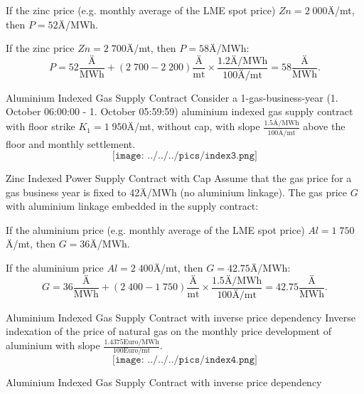 



	If the zinc price (e.g. monthly average of the LME spot price) $Zn=2\;000$Ä/mt, then \textcolor[rgb]{0.00,0.00,1.00}{$P=52$Ä/MWh}.


	If the zinc price $Zn=2\;700$Ä/mt, then \textcolor[rgb]{0.00,0.00,1.00}{$P=58$Ä/MWh}:
  $$P=52\frac{\text{Ä}}{\text{MWh}}+(2\;700-2\;200)\frac{\text{Ä}}{\text{mt}}\times\frac{1.2\text{Ä/MWh}}{100\text{Ä/mt}}=58\frac{\text{Ä}}{\text{MWh}}.$$





{Aluminium Indexed Gas Supply Contract}
Consider a 1-gas-business-year (1. October 06:00:00 - 1. October 05:59:59) aluminium indexed gas supply contract with floor strike $K_1=1\;950$Ä/mt, without cap, with slope $\frac{1.5\text{Ä/MWh}}{100\text{Ä/mt}}$ above the floor and monthly settlement.
$$\texttt{[image: ../../../pics/index3.png]}$$

{Zinc Indexed Power Supply Contract with Cap}
Assume that the gas price for a gas business year is fixed to \textcolor[rgb]{1.00,0.00,0.00}{42Ä/MWh} (no aluminium linkage). The gas price $G$ with aluminium linkage embedded in the supply contract:
\vspace{0.4cm}






	If the aluminium price (e.g. monthly average of the LME spot price) $Al=1\;750$Ä/mt, then \textcolor[rgb]{0.00,0.00,1.00}{$G=36$Ä/MWh}.


	If the aluminium price $Al=2\;400$Ä/mt, then \textcolor[rgb]{0.00,0.00,1.00}{$G=42.75$Ä/MWh}:
  $$G=36\frac{\text{Ä}}{\text{MWh}}+(2\;400-1\;750)\frac{\text{Ä}}{\text{mt}}\times\frac{1.5\text{Ä/MWh}}{100\text{Ä/mt}}=42.75\frac{\text{Ä}}{\text{MWh}}.$$





{Aluminium Indexed Gas Supply Contract with inverse price dependency}
Inverse indexation of the price of natural gas on the monthly price development of aluminium with slope $\frac{1.4375\text{Euro/MWh}}{100\text{Euro/mt}}$.
$$\texttt{[image: ../../../pics/index4.png]}$$

{Aluminium Indexed Gas Supply Contract with inverse price dependency}


